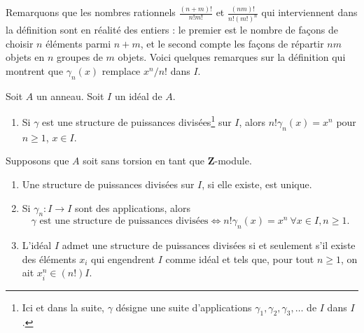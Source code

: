 \noindent
Remarquons que les nombres rationnels $\frac{(n + m)!}{n! m!}$
et $\frac{(nm)!}{n! (m!)^n}$ qui interviennent dans la définition sont en réalité des
entiers : le premier est le nombre de façons de choisir $n$ éléments parmi $n + m$,
et le second compte les façons de répartir $nm$
objets en $n$ groupes de $m$ objets.
Voici quelques remarques sur la définition qui montrent que
$\gamma_n(x)$ remplace $x^n/n!$ dans $I$.

\begin{lemma}
\label{lemma-silly}
Soit $A$ un anneau. Soit $I$ un idéal de $A$.
\begin{enumerate}
\item Si $\gamma$ est une structure de puissances divisées\footnote{Ici
et dans la suite, $\gamma$ désigne une suite
d'applications $\gamma_1, \gamma_2, \gamma_3, \ldots$ de $I$ dans $I$.}
sur $I$, alors
$n! \gamma_n(x) = x^n$ pour $n \geq 1$, $x \in I$.
\end{enumerate}
Supposons que $A$ soit sans torsion en tant que $\mathbf{Z}$-module.
\begin{enumerate}
\item[(2)] Une structure de puissances divisées sur $I$, si elle existe, est unique.
\item[(3)] Si $\gamma_n : I \to I$ sont des applications, alors
$$
\gamma\text{ est une structure de puissances divisées}
\Leftrightarrow
n! \gamma_n(x) = x^n\ \forall x \in I, n \geq 1.
$$
\item[(4)] L'idéal $I$ admet une structure de
puissances divisées si et seulement
s'il existe des éléments $x_i$ qui engendrent $I$ comme idéal et tels que,
pour tout $n \geq 1$, on ait $x_i^n \in (n!)I$.
\end{enumerate}
\end{lemma}

